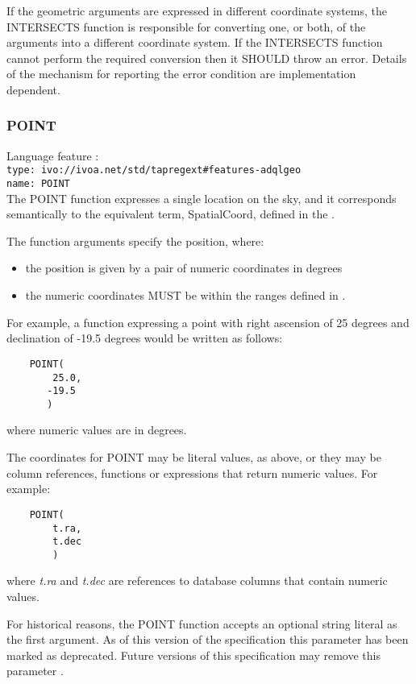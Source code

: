 \documentclass[11pt,a4paper]{ivoa}
\begin{document}
If the geometric arguments are expressed in different coordinate systems,
the INTERSECTS function is responsible for converting one, or both, of the
arguments into a different coordinate system.
If the INTERSECTS function cannot perform the required conversion then
it SHOULD throw an error.
Details of the mechanism for reporting the error condition are
implementation dependent.

\subsubsection{POINT}
\label{sec:functions.geom.point}
{\footnotesize Language feature :}\\
{\footnotesize \verb|type: ivo://ivoa.net/std/tapregext#features-adqlgeo|}\\
{\footnotesize \verb|name: POINT|}\\

The POINT function expresses a single location on the sky,
and it corresponds semantically to the equivalent term, SpatialCoord, defined in
the \STCSpec{}.

The function arguments specify the position, where:
\begin{itemize}
    \item the position is given by a pair of numeric coordinates in degrees
    \item the numeric coordinates MUST be within the ranges defined in
    .
\end{itemize}

For example, a function expressing a point with right ascension of 25 degrees
and declination of -19.5 degrees would be written as follows:
\begin{verbatim}
    POINT(
        25.0,
       -19.5
       )
\end{verbatim}
\noindent
where numeric values are in degrees.

The coordinates for POINT may be literal values, as above,
or they may be column references, functions or expressions that return
numeric values.
For example:
\begin{verbatim}
    POINT(
        t.ra,
        t.dec
        )
\end{verbatim}
\noindent
where \textit{t.ra} and \textit{t.dec} are references to database
columns that contain numeric values.

For historical reasons, the POINT function accepts an optional string literal
as the first argument.
As of this version of the specification this parameter has been
marked as deprecated.
Future versions of this specification may remove this parameter
.
\end{document}
